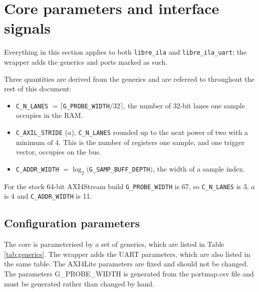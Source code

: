 \documentclass[twocolumn]{article}
\begin{document}
\newpage
\section{Core parameters and interface signals}
Everything in this section applies to both \texttt{libre\_ila} and \texttt{libre\_ila\_uart}; the wrapper adds the generics and ports marked as such.

Three quantities are derived from the generics and are referred to throughout the rest of this document:

\begin{itemize}
    \item \texttt{C\_N\_LANES} $= \lceil$\texttt{G\_PROBE\_WIDTH}$/32\rceil$, the number of 32-bit lanes one sample occupies in the RAM.
    \item \texttt{C\_AXIL\_STRIDE} ($a$), \texttt{C\_N\_LANES} rounded up to the next power of two with a minimum of 4. This is the number of registers one sample, and one trigger vector, occupies on the bus.
    \item \texttt{C\_ADDR\_WIDTH} $= \log_2($\texttt{G\_SAMP\_BUFF\_DEPTH}$)$, the width of a sample index.
\end{itemize}

For the stock 64-bit AXI4Stream build \texttt{G\_PROBE\_WIDTH} is 67, so \texttt{C\_N\_LANES} is 3, $a$ is 4 and \texttt{C\_ADDR\_WIDTH} is 11.

\subsection{Configuration parameters}
The core is parameterised by a set of generics, which are listed in Table \ref{tab:generics}. The wrapper adds the \acs{UART} parameters, which are also listed in the same table. The AXI4Lite parameters are fixed and should not be changed.  The parameters G\_PROBE\_WIDTH is generated from the portmap.csv file and must be generated rather than changed by hand. 
\end{document}
